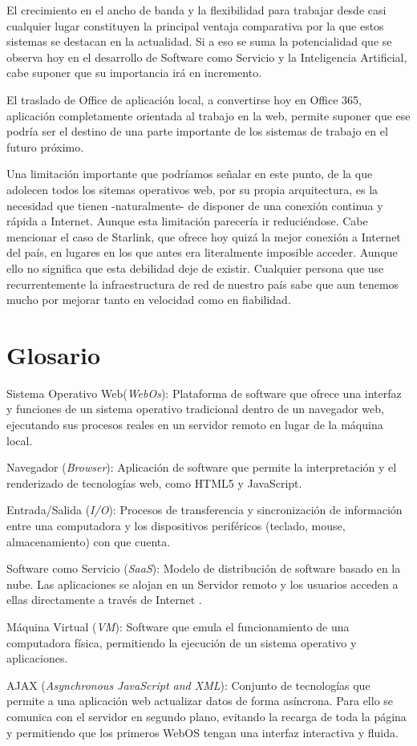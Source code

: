 \documentclass[11pt]{article}
\begin{document}
El crecimiento en el ancho de banda y la flexibilidad para trabajar desde 
casi cualquier lugar constituyen la principal ventaja comparativa por la que 
estos sistemas se destacan en la actualidad. Si a eso se suma la potencialidad 
que se observa hoy en el desarrollo de Software como Servicio y la Inteligencia 
Artificial, cabe suponer que su importancia irá en incremento.

El traslado de Office de aplicación local, a convertirse hoy en Office 365,
aplicación completamente orientada al trabajo en la web, permite suponer que 
ese podría ser el destino de una parte importante de los sistemas de trabajo en 
el futuro próximo.

Una limitación importante que podríamos señalar en este punto, de la que 
adolecen todos los sitemas operativos web, por su propia arquitectura, es la 
necesidad que tienen -naturalmente- de disponer de una conexión continua y 
rápida a Internet. Aunque esta limitación parecería ir reduciéndose. Cabe 
mencionar el caso de Starlink, que ofrece hoy quizá la mejor conexión a Internet 
del país, en lugares en los que antes era literalmente imposible acceder. Aunque 
ello no significa que esta debilidad deje de existir. Cualquier persona que use 
recurrentemente la infraestructura de red de nuestro país sabe que aun tenemos 
mucho por mejorar tanto en velocidad como en fiabilidad.

\pagebreak

\section*{Glosario}

Sistema Operativo Web(\textit{WebOs}): Plataforma de software que ofrece una
interfaz y funciones de un sistema operativo tradicional dentro de un navegador
web, ejecutando sus procesos reales en un servidor remoto en lugar de la máquina
local.

Navegador (\textit{Browser}): Aplicación de software que permite la
interpretación y el renderizado de tecnologías web, como HTML5 y JavaScript.

Entrada/Salida (\textit{I/O}): Procesos de transferencia y sincronización de
información entre una computadora y los dispositivos periféricos (teclado,
mouse, almacenamiento) con que cuenta.

Software como Servicio (\textit{SaaS}): Modelo de distribución de software
basado en la nube. Las aplicaciones se alojan en un Servidor remoto y los
usuarios acceden a ellas directamente a través de Internet .

Máquina Virtual (\textit{VM}): Software que emula el funcionamiento
de una computadora física, permitiendo la ejecución de un sistema operativo y
aplicaciones.

AJAX (\textit{Asynchronous JavaScript and XML}): Conjunto de tecnologías
que permite a una aplicación web actualizar datos de forma asíncrona. Para ello
se comunica con el servidor en segundo plano, evitando la recarga de toda la
página y permitiendo que los primeros WebOS tengan una interfaz interactiva y
fluida.
\end{document}

